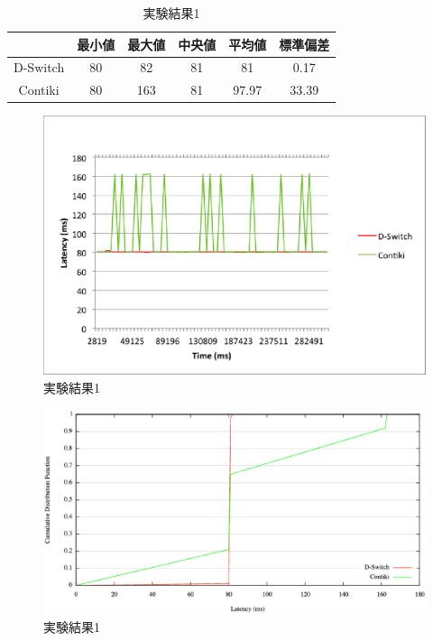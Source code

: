 \begin{table}[htbp]
  \centering
  \caption{実験結果1}
  \begin{tabular}{|c||c|c|c|c|c|} \hline
    \backslashbox{}{} & 最小値 & 最大値 & 中央値 & 平均値 & 標準偏差 \\ \hline \hline
    D-Switch & 80 & 82 & 81 & 81 & 0.17 \\ \hline
    Contiki & 80 & 163 & 81 & 97.97 & 33.39 \\ \hline
  \end{tabular}
  \label{tab:latency1}
\end{table}

\begin{figure}[htbp]
 \begin{center}
  \includegraphics[width=120mm]{./images/latency1.eps}
 \end{center}
 \caption{実験結果1}
 \label{fig:latency1}
\end{figure}

\begin{figure}[htbp]
 \begin{center}
  \includegraphics[width=120mm]{./images/cdf1.eps}
 \end{center}
 \caption{実験結果1}
 \label{fig:cdf1}
\end{figure}


